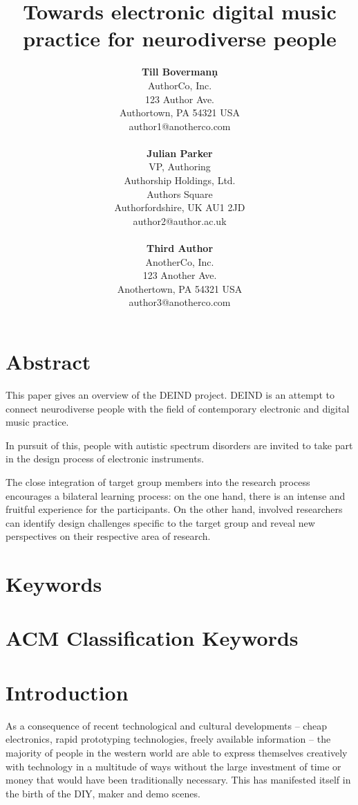 \documentclass{chi-ext}
\title{Towards electronic digital music practice for neurodiverse people}
\author{
  \textbf{Till Bovermanṇ} \\
  AuthorCo, Inc. \\
  123 Author Ave. \\
  Authortown, PA 54321 USA \\
  author1@anotherco.com \\
  \\
  \textbf{Julian Parker} \\
  VP, Authoring \\
  Authorship Holdings, Ltd. \\
  Authors Square \\
  Authorfordshire, UK AU1 2JD \\
  author2@author.ac.uk \\
  \\
  \textbf{Third Author} \\
  AnotherCo, Inc. \\
  123 Another Ave. \\
  Anothertown, PA 54321 USA \\
  author3@anotherco.com \\
}
\begin{document}
\maketitle

\begin{multicols}{2}
  
\makeauthors
\makecopyright

\section{Abstract}
This paper gives an overview of the DEIND project. DEIND is an attempt to connect neurodiverse people with the field of contemporary electronic and digital music practice. 

In pursuit of this, people with autistic spectrum disorders are invited to take part in the design process of electronic instruments.

The close integration of target group members into the research process encourages a bilateral learning process: on the one hand, there is an intense and fruitful experience for the participants. On the other hand, involved researchers can identify design challenges specific to the target group and reveal new perspectives on their respective area of research.

\section{Keywords}
\makeatletter \@keywords \makeatother

\section{ACM Classification Keywords}
\makeatletter \@acmclassification \makeatother


\section{Introduction}

As a consequence of recent technological and cultural developments -- cheap electronics, rapid prototyping technologies, freely available information -- the majority of people in the western world are able to express themselves creatively with technology in a multitude of ways without the large investment of time or money that would have been traditionally necessary. This has manifested itself in the birth of the DIY, maker and demo scenes.


\end{multicols}
\end{document}
